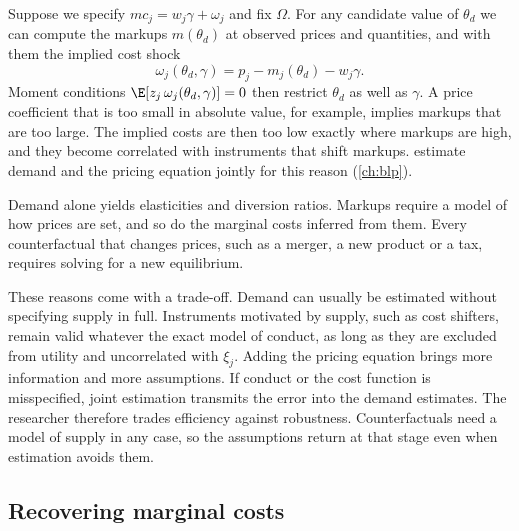 Suppose we specify $mc_j = w_j\gamma + \omega_j$ and fix $\Omega$. For any candidate value of $\theta_d$ we can
compute the markups $m(\theta_d)$ at observed prices and quantities, and with them the implied cost shock
\begin{equation*}
\omega_j(\theta_d, \gamma) = p_j - m_j(\theta_d) - w_j\gamma .
\end{equation*}
Moment conditions $\E[z_j\,\omega_j(\theta_d, \gamma)] = 0$ then restrict $\theta_d$ as well as $\gamma$. A price
coefficient that is too small in absolute value, for example, implies markups that are too large. The implied
costs are then too low exactly where markups are high, and they become correlated with instruments that shift
markups. \citet{BerryLevinsohnPakes1995} estimate demand and the pricing equation jointly for this reason
(\cref{ch:blp}).

Demand alone yields elasticities and diversion ratios. Markups require a model of how prices are set, and so do
the marginal costs inferred from them. Every counterfactual that changes prices, such as a merger, a new product
or a tax, requires solving for a new equilibrium.

These reasons come with a trade-off. Demand can usually be estimated without specifying supply in full.
Instruments motivated by supply, such as cost shifters, remain valid whatever the exact model of conduct, as long
as they are excluded from utility and uncorrelated with $\xi_j$. Adding the pricing equation brings more
information and more assumptions. If conduct or the cost function is misspecified, joint estimation transmits the
error into the demand estimates. The researcher therefore trades efficiency against robustness. Counterfactuals
need a model of supply in any case, so the assumptions return at that stage even when estimation avoids them.

\subsection{Recovering marginal costs}\label{sec:04-mc}

